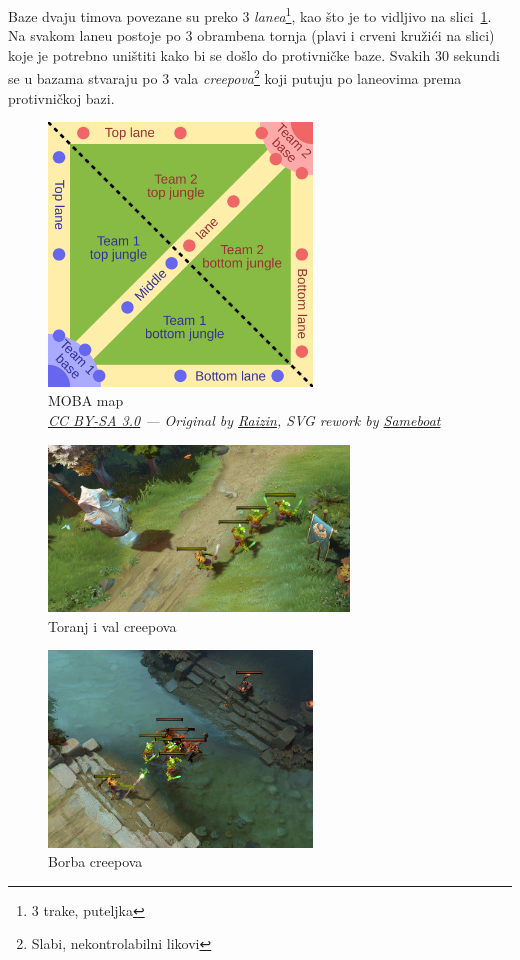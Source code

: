 \documentclass[times, utf8, zavrsni, numeric]{fer}
\begin{document}
Baze dvaju timova povezane su preko 3 \emph{lanea}\footnote{3 trake, puteljka
}, kao što je to vidljivo na slici~\ref{fig:moba-map}. Na svakom
laneu postoje po 3 obrambena tornja (plavi i crveni kružići na slici) koje je
potrebno uništiti kako bi se došlo do protivničke baze. Svakih 30 sekundi se u
bazama stvaraju po 3 vala \emph{creepova}\footnote{Slabi, nekontrolabilni
likovi} koji putuju po laneovima prema protivničkoj bazi.

\begin{figure}[h] 
    \centering
    \includegraphics[width=7cm]{img/Map_of_MOBA}
    \caption{MOBA map\\ \textsl{\scriptsize
    \href{https://creativecommons.org/licenses/by-sa/3.0/deed.en}{CC BY-SA 3.0}
    --- Original by
    \href{https://commons.wikimedia.org/wiki/User:Raizin}{Raizin}, SVG rework by
    \href{https://commons.wikimedia.org/wiki/User:Sameboat}{Sameboat}}}\label{fig:moba-map}
\end{figure}

\begin{figure}[h] 
    \centering
    \includegraphics[width=8cm]{img/tower-creeps}
    \caption{Toranj i val creepova}\label{fig:tower-creeps}
\end{figure}

\begin{figure}[h] 
    \centering
    \includegraphics[width=7cm]{img/creeps-mid}
    \caption{Borba creepova}\label{fig:creep-fight}
\end{figure}
\end{document}
